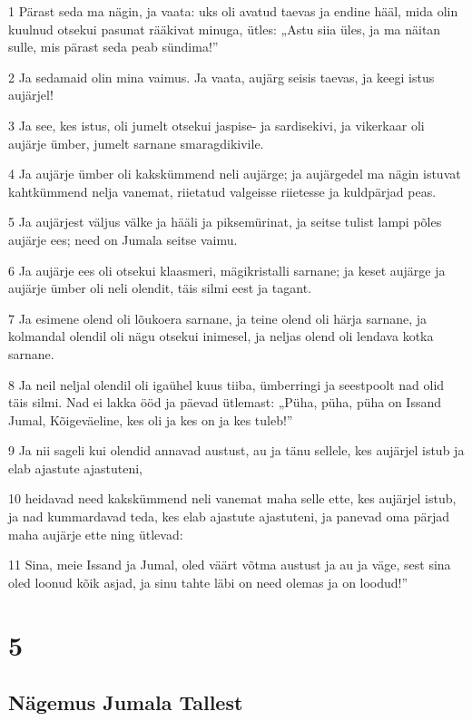 \par 1 Pärast seda ma nägin, ja vaata: uks oli avatud taevas ja endine hääl, mida olin kuulnud otsekui pasunat rääkivat minuga, ütles: „Astu siia üles, ja ma näitan sulle, mis pärast seda peab sündima!”
\par 2 Ja sedamaid olin mina vaimus. Ja vaata, aujärg seisis taevas, ja keegi istus aujärjel!
\par 3 Ja see, kes istus, oli jumelt otsekui jaspise- ja sardisekivi, ja vikerkaar oli aujärje ümber, jumelt sarnane smaragdikivile.
\par 4 Ja aujärje ümber oli kakskümmend neli aujärge; ja aujärgedel ma nägin istuvat kahtkümmend nelja vanemat, riietatud valgeisse riietesse ja kuldpärjad peas.
\par 5 Ja aujärjest väljus välke ja hääli ja piksemürinat, ja seitse tulist lampi põles aujärje ees; need on Jumala seitse vaimu.
\par 6 Ja aujärje ees oli otsekui klaasmeri, mägikristalli sarnane; ja keset aujärge ja aujärje ümber oli neli olendit, täis silmi eest ja tagant.
\par 7 Ja esimene olend oli lõukoera sarnane, ja teine olend oli härja sarnane, ja kolmandal olendil oli nägu otsekui inimesel, ja neljas olend oli lendava kotka sarnane.
\par 8 Ja neil neljal olendil oli igaühel kuus tiiba, ümberringi ja seestpoolt nad olid täis silmi. Nad ei lakka ööd ja päevad ütlemast: „Püha, püha, püha on Issand Jumal, Kõigeväeline, kes oli ja kes on ja kes tuleb!”
\par 9 Ja nii sageli kui olendid annavad austust, au ja tänu sellele, kes aujärjel istub ja elab ajastute ajastuteni,
\par 10 heidavad need kakskümmend neli vanemat maha selle ette, kes aujärjel istub, ja nad kummardavad teda, kes elab ajastute ajastuteni, ja panevad oma pärjad maha aujärje ette ning ütlevad:
\par 11 Sina, meie Issand ja Jumal, oled väärt võtma austust ja au ja väge, sest sina oled loonud kõik asjad, ja sinu tahte läbi on need olemas ja on loodud!”


\chapter{5}

\section*{Nägemus Jumala Tallest}

